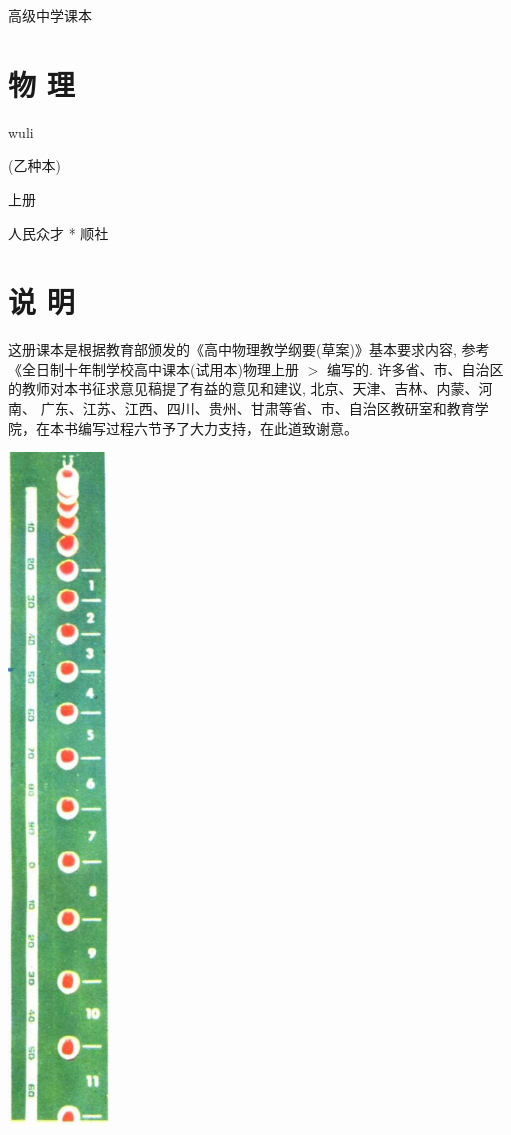 \documentclass[10pt]{article}
\begin{document}
高级中学课本

\section*{物 理}

wuli

(乙种本)

上册

人民众才 * 顺社

\section*{说 明}

这册课本是根据教育部颁发的《高中物理教学纲要(草案)》基本要求内容, 参考《全日制十年制学校高中课本(试用本)物理上册 \(>\) 编写的. 许多省、市、自治区的教师对本书征求意见稿提了有益的意见和建议, 北京、天津、吉林、内蒙、河南、 广东、江苏、江西、四川、贵州、甘肃等省、市、自治区教研室和教育学院，在本书编写过程六节予了大力支持，在此道致谢意。

\begin{center}
\includegraphics[max width=0.2\textwidth]{images/01912d55-147c-70aa-b0e0-1782a122f948_3_912011.jpg}
\end{center}
\end{document}
